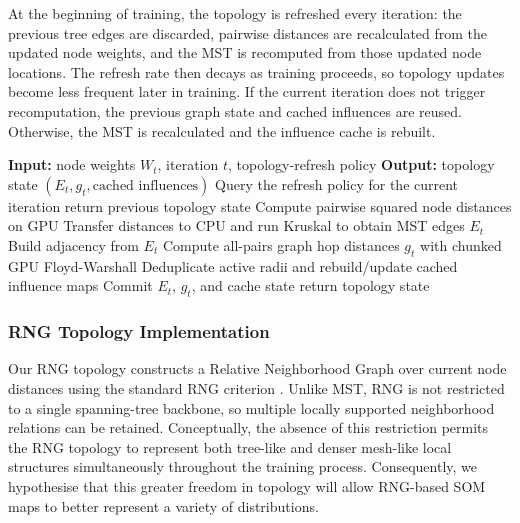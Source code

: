 \documentclass[10pt]{article} %
\begin{document}
At the beginning of training, the topology is refreshed every iteration: the previous tree edges are discarded, pairwise distances are recalculated from the updated node weights, and the MST is recomputed from those updated node locations. The refresh rate then decays as training proceeds, so topology updates become less frequent later in training. If the current iteration does not trigger recomputation, the previous graph state and cached influences are reused. Otherwise, the MST is recalculated and the influence cache is rebuilt.

\begin{algorithm}[H]
\caption{Dynamic MST topology update with refresh-triggered recomputation and cached influence reuse.}
\begin{algorithmic}[1]
\State \textbf{Input:} node weights $W_t$, iteration $t$, topology-refresh policy
\State \textbf{Output:} topology state $(E_t, g_t, \text{cached influences})$
\State Query the refresh policy for the current iteration
\State return previous topology state
\EndIf
\State Compute pairwise squared node distances on GPU
\State Transfer distances to CPU and run Kruskal to obtain MST edges $E_t$
\State Build adjacency from $E_t$
\State Compute all-pairs graph hop distances $g_t$ with chunked GPU Floyd-Warshall
\State Deduplicate active radii and rebuild/update cached influence maps
\State Commit $E_t$, $g_t$, and cache state
\State return topology state
\end{algorithmic}
\end{algorithm}

\subsubsection{RNG Topology Implementation}

Our RNG topology constructs a Relative Neighborhood Graph over current node distances using the standard RNG criterion \citep{toussaintRelativeNeighbourhoodGraph1980}. Unlike MST, RNG is not restricted to a single spanning-tree backbone, so multiple locally supported neighborhood relations can be retained. Conceptually, the absence of this restriction permits the RNG topology to represent both tree-like and denser mesh-like local structures simultaneously throughout the training process. Consequently, we hypothesise that this greater freedom in topology will allow RNG-based SOM maps to better represent a variety of distributions.
\end{document}
